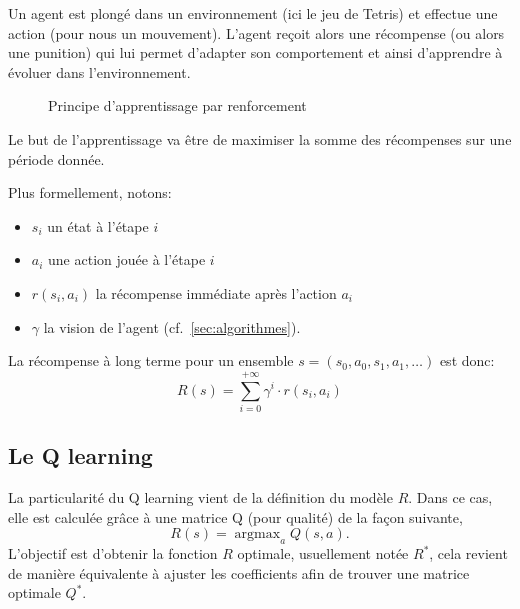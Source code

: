 \documentclass{report}
\DeclareMathOperator{\argmax}{argmax}
\begin{document}
Un agent est plongé dans un environnement (ici le jeu de Tetris) et effectue une
action (pour nous un mouvement). L'agent reçoit alors une récompense (ou alors
une punition) qui lui permet d'adapter son comportement et ainsi d'apprendre à
évoluer dans l'environnement.

\begin{figure}[h]
    \begin{center}
    \end{center}

    \caption{Principe d'apprentissage par renforcement}
    \label{}
\end{figure}

Le but de l'apprentissage va être de maximiser la somme des récompenses sur une
période donnée.

Plus formellement, notons:
\begin{itemize}
    \item \( s_i \) un état à l'étape \( i \)
    \item \( a_i \) une action jouée à l'étape \( i \)
    \item \( r(s_i, a_i) \) la récompense immédiate après l'action \( a_i \)
    \item \( \gamma \) la vision de l'agent (cf.~\ref{sec:algorithmes}).
\end{itemize}

La récompense à long terme pour un ensemble
\( s = (s_0, a_0, s_1, a_1, \hdots) \) est donc:
\[
  R(s) = \sum_{i=0}^{+\infty}\gamma^i \cdot r(s_i, a_i)
\]


\subsection{Le Q learning}
La particularité du Q learning vient de la définition du modèle \(R\). Dans ce
cas, elle est calculée grâce à une matrice Q (pour qualité) de la façon
suivante,
\[
  R(s) = \argmax_{a} Q(s,a).
\]
L'objectif est d'obtenir la fonction \(R\) optimale, usuellement notée
\(R^*\), cela revient de manière équivalente à ajuster les coefficients afin de
trouver une matrice optimale \(Q^*\).
\end{document}
